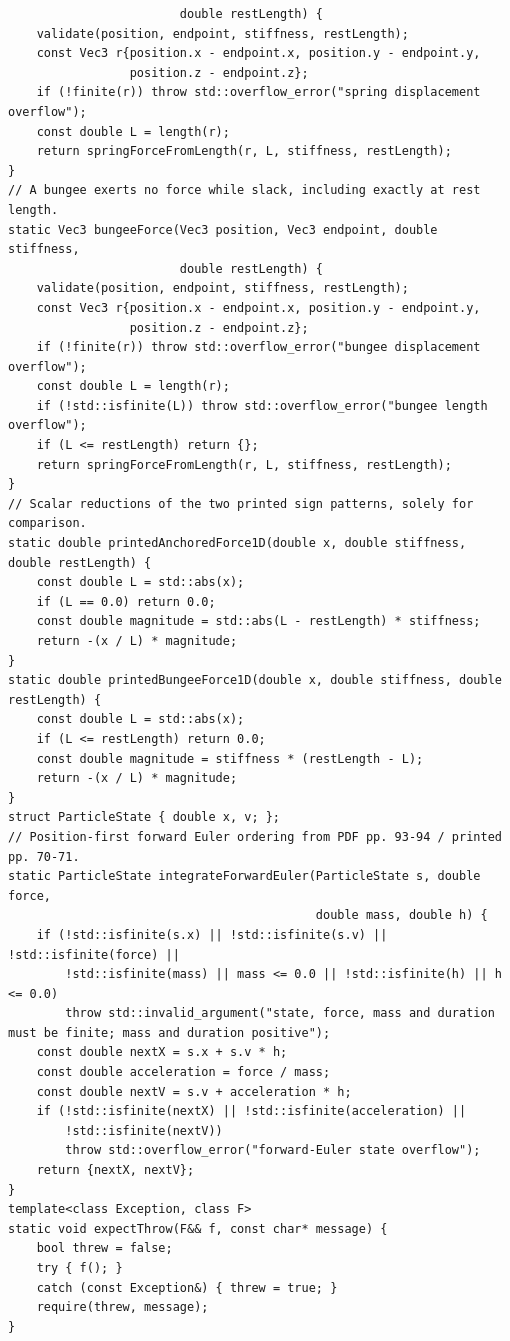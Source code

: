 \begin{verbatim}
                        double restLength) {
    validate(position, endpoint, stiffness, restLength);
    const Vec3 r{position.x - endpoint.x, position.y - endpoint.y,
                 position.z - endpoint.z};
    if (!finite(r)) throw std::overflow_error("spring displacement overflow");
    const double L = length(r);
    return springForceFromLength(r, L, stiffness, restLength);
}
// A bungee exerts no force while slack, including exactly at rest length.
static Vec3 bungeeForce(Vec3 position, Vec3 endpoint, double stiffness,
                        double restLength) {
    validate(position, endpoint, stiffness, restLength);
    const Vec3 r{position.x - endpoint.x, position.y - endpoint.y,
                 position.z - endpoint.z};
    if (!finite(r)) throw std::overflow_error("bungee displacement overflow");
    const double L = length(r);
    if (!std::isfinite(L)) throw std::overflow_error("bungee length overflow");
    if (L <= restLength) return {};
    return springForceFromLength(r, L, stiffness, restLength);
}
// Scalar reductions of the two printed sign patterns, solely for comparison.
static double printedAnchoredForce1D(double x, double stiffness, double restLength) {
    const double L = std::abs(x);
    if (L == 0.0) return 0.0;
    const double magnitude = std::abs(L - restLength) * stiffness;
    return -(x / L) * magnitude;
}
static double printedBungeeForce1D(double x, double stiffness, double restLength) {
    const double L = std::abs(x);
    if (L <= restLength) return 0.0;
    const double magnitude = stiffness * (restLength - L);
    return -(x / L) * magnitude;
}
struct ParticleState { double x, v; };
// Position-first forward Euler ordering from PDF pp. 93-94 / printed pp. 70-71.
static ParticleState integrateForwardEuler(ParticleState s, double force,
                                           double mass, double h) {
    if (!std::isfinite(s.x) || !std::isfinite(s.v) || !std::isfinite(force) ||
        !std::isfinite(mass) || mass <= 0.0 || !std::isfinite(h) || h <= 0.0)
        throw std::invalid_argument("state, force, mass and duration must be finite; mass and duration positive");
    const double nextX = s.x + s.v * h;
    const double acceleration = force / mass;
    const double nextV = s.v + acceleration * h;
    if (!std::isfinite(nextX) || !std::isfinite(acceleration) ||
        !std::isfinite(nextV))
        throw std::overflow_error("forward-Euler state overflow");
    return {nextX, nextV};
}
template<class Exception, class F>
static void expectThrow(F&& f, const char* message) {
    bool threw = false;
    try { f(); }
    catch (const Exception&) { threw = true; }
    require(threw, message);
}


\end{verbatim}
